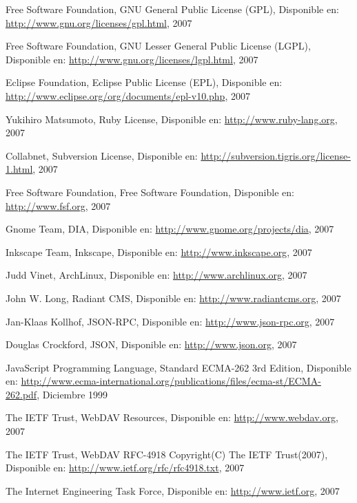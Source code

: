 \begin{thebibliography}{99}

 Free Software Foundation, GNU General Public License (GPL), Disponible en: 	\url{http://www.gnu.org/licenses/gpl.html}, 2007

 Free Software Foundation, GNU Lesser General Public License (LGPL), Disponible en:
	\url{http://www.gnu.org/licenses/lgpl.html}, 2007

 Eclipse Foundation, Eclipse Public License (EPL), Disponible en:
	\url{http://www.eclipse.org/org/documents/epl-v10.php}, 2007

 Yukihiro Matsumoto, Ruby License, Disponible en:
	\url{http://www.ruby-lang.org}, 2007

 Collabnet, Subversion License, Disponible en:
	\url{http://subversion.tigris.org/license-1.html}, 2007

 Free Software Foundation, Free Software Foundation, Disponible en:
	\url{http://www.fsf.org}, 2007

 Gnome Team, DIA, Disponible en:
	\url{http://www.gnome.org/projects/dia}, 2007

 Inkscape Team, Inkscape, Disponible en:
	\url{http://www.inkscape.org}, 2007

 Judd Vinet, ArchLinux, Disponible en:
	\url{http://www.archlinux.org}, 2007

 John W. Long, Radiant CMS, Disponible en:
	\url{http://www.radiantcms.org}, 2007

 Jan-Klaas Kollhof, JSON-RPC, Disponible en:
	\url{http://www.json-rpc.org}, 2007

 Douglas Crockford, JSON, Disponible en:
	\url{http://www.json.org}, 2007

 JavaScript Programming Language, Standard ECMA-262 3rd Edition, Disponible en:
	\url{http://www.ecma-international.org/publications/files/ecma-st/ECMA-262.pdf}, Diciembre 1999

 The IETF Trust, WebDAV Resources, Disponible en:
	\url{http://www.webdav.org}, 2007

 The IETF Trust, WebDAV RFC-4918 Copyright(C) The IETF Trust(2007), Disponible en:
	\url{http://www.ietf.org/rfc/rfc4918.txt}, 2007

 The Internet Engineering Task Force, Disponible en:
	\url{http://www.ietf.org}, 2007


\end{thebibliography}
